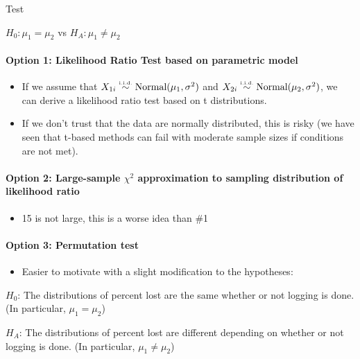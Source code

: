 \documentclass[]{article}
\providecommand{\tightlist}{%
  \setlength{\itemsep}{0pt}\setlength{\parskip}{0pt}}
\let\oldparagraph\paragraph
\renewcommand{\paragraph}[1]{\oldparagraph{#1}\mbox{}}
\begin{document}
Test

\(H_0: \mu_1 = \mu_2\) vs \(H_A: \mu_1 \neq \mu_2\)

\paragraph{Option 1: Likelihood Ratio Test based on parametric
model}\label{option-1-likelihood-ratio-test-based-on-parametric-model}

\begin{itemize}
\item
  If we assume that \(X_{1i} \stackrel{{\mbox{\text{\tiny i.i.d.}}}}{\sim} \text{Normal}(\mu_1, \sigma^2)\)
  and \(X_{2i} \stackrel{{\mbox{\text{\tiny i.i.d.}}}}{\sim} \text{Normal}(\mu_2, \sigma^2)\), we can derive a
  likelihood ratio test based on t distributions.
\item
  If we don't trust that the data are normally distributed, this is
  risky (we have seen that t-based methods can fail with moderate sample
  sizes if conditions are not met).
\end{itemize}

\paragraph{\texorpdfstring{Option 2: Large-sample \(\chi^2\)
approximation to sampling distribution of likelihood
ratio}{Option 2: Large-sample \textbackslash{}chi\^{}2 approximation to sampling distribution of likelihood ratio}}\label{option-2-large-sample-chi2-approximation-to-sampling-distribution-of-likelihood-ratio}

\begin{itemize}
\tightlist
\item
  15 is not large, this is a worse idea than \#1
\end{itemize}

\paragraph{Option 3: Permutation test}\label{option-3-permutation-test}

\begin{itemize}
\tightlist
\item
  Easier to motivate with a slight modification to the hypotheses:
\end{itemize}

\(H_0\): The distributions of percent lost are the same whether or not
logging is done. (In particular, \(\mu_1 = \mu_2\))

\(H_A\): The distributions of percent lost are different depending on
whether or not logging is done. (In particular, \(\mu_1 \neq \mu_2\))
\end{document}
